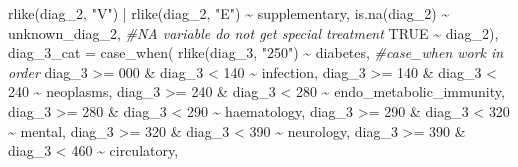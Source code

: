 \documentclass[
]{article}
\newenvironment{Shaded}{\begin{snugshade}}{\end{snugshade}}
\newcommand{\AttributeTok}[1]{\textcolor[rgb]{0.77,0.63,0.00}{#1}}
\newcommand{\CommentTok}[1]{\textcolor[rgb]{0.56,0.35,0.01}{\textit{#1}}}
\newcommand{\ConstantTok}[1]{\textcolor[rgb]{0.00,0.00,0.00}{#1}}
\newcommand{\DecValTok}[1]{\textcolor[rgb]{0.00,0.00,0.81}{#1}}
\newcommand{\FunctionTok}[1]{\textcolor[rgb]{0.00,0.00,0.00}{#1}}
\newcommand{\NormalTok}[1]{#1}
\newcommand{\SpecialCharTok}[1]{\textcolor[rgb]{0.00,0.00,0.00}{#1}}
\newcommand{\StringTok}[1]{\textcolor[rgb]{0.31,0.60,0.02}{#1}}
\begin{document}
\begin{Shaded}
\begin{Highlighting}[]
      \FunctionTok{rlike}\NormalTok{(diag\_2, }\StringTok{"V"}\NormalTok{) }\SpecialCharTok{|} \FunctionTok{rlike}\NormalTok{(diag\_2, }\StringTok{"E"}\NormalTok{) }\SpecialCharTok{\textasciitilde{}} \StringTok{\textquotesingle{}supplementary\textquotesingle{}}\NormalTok{,}
      \FunctionTok{is.na}\NormalTok{(diag\_2) }\SpecialCharTok{\textasciitilde{}} \StringTok{\textquotesingle{}unknown\_diag\_2\textquotesingle{}}\NormalTok{, }\CommentTok{\#NA variable do not get special treatment}
      \ConstantTok{TRUE} \SpecialCharTok{\textasciitilde{}}\NormalTok{ diag\_2),}
    \AttributeTok{diag\_3\_cat =} \FunctionTok{case\_when}\NormalTok{(}
      \FunctionTok{rlike}\NormalTok{(diag\_3, }\StringTok{"250"}\NormalTok{) }\SpecialCharTok{\textasciitilde{}} \StringTok{\textquotesingle{}diabetes\textquotesingle{}}\NormalTok{, }\CommentTok{\#case\_when work in order}
\NormalTok{      diag\_3 }\SpecialCharTok{\textgreater{}=} \DecValTok{000} \SpecialCharTok{\&}\NormalTok{ diag\_3 }\SpecialCharTok{\textless{}} \DecValTok{140} \SpecialCharTok{\textasciitilde{}} \StringTok{\textquotesingle{}infection\textquotesingle{}}\NormalTok{,}
\NormalTok{      diag\_3 }\SpecialCharTok{\textgreater{}=} \DecValTok{140} \SpecialCharTok{\&}\NormalTok{ diag\_3 }\SpecialCharTok{\textless{}} \DecValTok{240} \SpecialCharTok{\textasciitilde{}} \StringTok{\textquotesingle{}neoplasms\textquotesingle{}}\NormalTok{,}
\NormalTok{      diag\_3 }\SpecialCharTok{\textgreater{}=} \DecValTok{240} \SpecialCharTok{\&}\NormalTok{ diag\_3 }\SpecialCharTok{\textless{}} \DecValTok{280} \SpecialCharTok{\textasciitilde{}} \StringTok{\textquotesingle{}endo\_metabolic\_immunity\textquotesingle{}}\NormalTok{,}
\NormalTok{      diag\_3 }\SpecialCharTok{\textgreater{}=} \DecValTok{280} \SpecialCharTok{\&}\NormalTok{ diag\_3 }\SpecialCharTok{\textless{}} \DecValTok{290} \SpecialCharTok{\textasciitilde{}} \StringTok{\textquotesingle{}haematology\textquotesingle{}}\NormalTok{,}
\NormalTok{      diag\_3 }\SpecialCharTok{\textgreater{}=} \DecValTok{290} \SpecialCharTok{\&}\NormalTok{ diag\_3 }\SpecialCharTok{\textless{}} \DecValTok{320} \SpecialCharTok{\textasciitilde{}} \StringTok{\textquotesingle{}mental\textquotesingle{}}\NormalTok{,}
\NormalTok{      diag\_3 }\SpecialCharTok{\textgreater{}=} \DecValTok{320} \SpecialCharTok{\&}\NormalTok{ diag\_3 }\SpecialCharTok{\textless{}} \DecValTok{390} \SpecialCharTok{\textasciitilde{}} \StringTok{\textquotesingle{}neurology\textquotesingle{}}\NormalTok{,}
\NormalTok{      diag\_3 }\SpecialCharTok{\textgreater{}=} \DecValTok{390} \SpecialCharTok{\&}\NormalTok{ diag\_3 }\SpecialCharTok{\textless{}} \DecValTok{460} \SpecialCharTok{\textasciitilde{}} \StringTok{\textquotesingle{}circulatory\textquotesingle{}}\NormalTok{,}

\end{Highlighting}
\end{Shaded}
\end{document}
